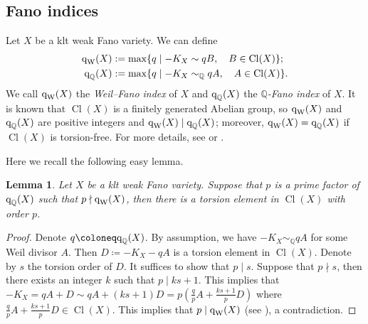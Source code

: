 \documentclass[12pt,twoside]{amsart}
\DeclareMathOperator{\Cl}{Cl}
\newcommand{\qW}{\text{\rm q}_{\text{\rm W}}}
\newcommand{\qQ}{\text{\rm q}_{\mathbb{Q}}}
\newtheorem{lem}[thm]{Lemma}
\theoremstyle{definition}
\begin{document}

\subsection{Fano indices}\label{subsec.fi}

 Let $X$ be a klt weak Fano variety. %
 We can define %
 \begin{align*} 
 \qW(X) {}&:=\max\{q \mid -K_X \sim qB, \quad B\in \Cl (X) \};\\
 \qQ(X) {}&:=\max\{q \mid -K_X \sim_{\mathbb Q}qA, \quad A\in \Cl (X) \}. 
 \end{align*}
 We call $\qW(X)$ the \emph{Weil--Fano index} of $X$ and $\qQ(X)$ the \emph{$\mathbb Q$-Fano index} of $X$. %
 It is known that $\Cl (X)$ is a finitely generated Abelian group, so $\qW(X)$ and $\qQ(X)$ are positive integers and $\qW(X)\mid \qQ (X)$; moreover, $\qW(X)= \qQ (X)$ if $\Cl (X)$ is torsion-free. 
 For more details, see \cite[\S\,2]{IskovskikhProkhorov1999} or \cite{Prokhorov2010}.

Here we recall the following easy lemma.
\begin{lem}\label{lem ex torsion}
    Let $X$ be a klt weak Fano variety. Suppose that $p$ is a prime factor of $\qQ(X)$ such that $p\nmid \qW(X)$, then there is a torsion element in $\Cl (X)$ with order $p$.
\end{lem}
\begin{proof}
    Denote $q\coloneq \qQ(X)$. By assumption, we have $-K_X\sim_\mathbb{Q}qA$ for some Weil divisor $A$. Then $D\coloneq -K_X-qA$ is a torsion element in $\Cl(X)$. Denote by $s$ the torsion order of $D$. It suffices to show that $p\mid s$. Suppose that $p\nmid s$, then there exists an integer $k$ such that $p\mid ks+1$. This implies that $-K_X=qA+D\sim qA+(ks+1)D=p(\frac{q}{p}A+\frac{ks+1}{p}D)$ where $\frac{q}{p}A+\frac{ks+1}{p}D\in \Cl(X)$. This implies that $p\mid \qW(X)$ (see \cite[Proof of Lemma~3.2(1)]{Prokhorov2010}), a contradiction. 
 \end{proof}
\end{document}

